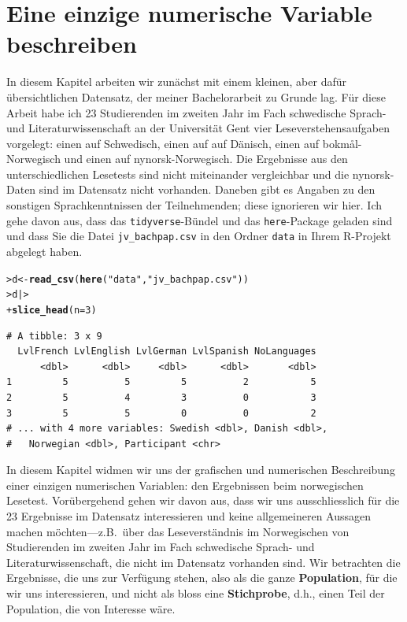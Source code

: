 \documentclass[oneside, 10pt]{book}\usepackage[]{graphicx}\usepackage[]{xcolor}
\makeatletter
\newcommand{\hlnum}[1]{\textcolor[rgb]{0.686,0.059,0.569}{#1}}%
\newcommand{\hlstr}[1]{\textcolor[rgb]{0.192,0.494,0.8}{#1}}%
\newcommand{\hlstd}[1]{\textcolor[rgb]{0.345,0.345,0.345}{#1}}%
\newcommand{\hlkwb}[1]{\textcolor[rgb]{0.69,0.353,0.396}{#1}}%
\newcommand{\hlkwc}[1]{\textcolor[rgb]{0.333,0.667,0.333}{#1}}%
\newcommand{\hlkwd}[1]{\textcolor[rgb]{0.737,0.353,0.396}{\textbf{#1}}}%
\newenvironment{kframe}{%
 \def\at@end@of@kframe{}%
 \ifinner\ifhmode%
  \def\at@end@of@kframe{\end{minipage}}%
  \begin{minipage}{\columnwidth}%
 \fi\fi%
 \def\FrameCommand##1{\hskip\@totalleftmargin \hskip-\fboxsep
 \colorbox{shadecolor}{##1}\hskip-\fboxsep
     \hskip-\linewidth \hskip-\@totalleftmargin \hskip\columnwidth}%
 \MakeFramed {\advance\hsize-\width
   \@totalleftmargin\z@ \linewidth\hsize
   \@setminipage}}%
 {\par\unskip\endMakeFramed%
 \at@end@of@kframe}
\newenvironment{knitrout}{}{} %
\makeatother
\begin{document}
\chapter{Eine einzige numerische Variable beschreiben}\label{ch:descriptives}
In diesem Kapitel arbeiten wir zunächst mit
einem kleinen, aber dafür übersichtlichen Datensatz,
der meiner Bachelorarbeit zu Grunde lag.
Für diese Arbeit habe ich 23 Studierenden im zweiten Jahr im
Fach schwedische Sprach- und Literaturwissenschaft
an der Universität Gent vier Leseverstehensaufgaben vorgelegt:
einen auf Schwedisch, einen auf auf
Dänisch, einen auf bokm\aa{}l-Norwegisch
und einen auf nynorsk-Norwegisch.
Die Ergebnisse aus den unterschiedlichen Lesetests
sind nicht miteinander vergleichbar und die nynorsk-Daten
sind im Datensatz nicht vorhanden.
Daneben gibt es Angaben zu den sonstigen Sprachkenntnissen
der Teilnehmenden; diese ignorieren wir hier.
Ich gehe davon aus, dass das \texttt{tidyverse}-Bündel
und das \texttt{here}-Package geladen sind und dass
Sie die Datei \texttt{jv\_bachpap.csv} in den Ordner
\texttt{data} in Ihrem R-Projekt abgelegt haben.
\begin{knitrout}
\color{fgcolor}\begin{kframe}
\begin{alltt}
\hlstd{> }\hlstd{d} \hlkwb{<-} \hlkwd{read_csv}\hlstd{(}\hlkwd{here}\hlstd{(}\hlstr{"data"}\hlstd{,} \hlstr{"jv_bachpap.csv"}\hlstd{))}
\hlstd{> }\hlstd{d |>}
\hlstd{+ }  \hlkwd{slice_head}\hlstd{(}\hlkwc{n} \hlstd{=} \hlnum{3}\hlstd{)}
\end{alltt}
\begin{verbatim}
# A tibble: 3 x 9
  LvlFrench LvlEnglish LvlGerman LvlSpanish NoLanguages
      <dbl>      <dbl>     <dbl>      <dbl>       <dbl>
1         5          5         5          2           5
2         5          4         3          0           3
3         5          5         0          0           2
# ... with 4 more variables: Swedish <dbl>, Danish <dbl>,
#   Norwegian <dbl>, Participant <chr>
\end{verbatim}
\end{kframe}
\end{knitrout}

In diesem Kapitel widmen wir uns der grafischen
und numerischen Beschreibung einer einzigen numerischen
Variablen: den Ergebnissen beim norwegischen Lesetest.
Vorübergehend gehen wir davon aus, dass wir uns
ausschliesslich für die 23 Ergebnisse im Datensatz
interessieren und keine allgemeineren Aussagen machen
möchten---z.B.\ über das Leseverständnis im Norwegischen
von Studierenden im zweiten Jahr im
Fach schwedische Sprach- und Literaturwissenschaft, die
nicht im Datensatz vorhanden sind.
Wir betrachten die Ergebnisse, die uns zur Verfügung
stehen, also als die ganze \textbf{Population}, für die
wir uns interessieren, und nicht als bloss eine
\textbf{Stichprobe}, d.h., einen Teil der Population,
die von Interesse wäre.
\end{document}
